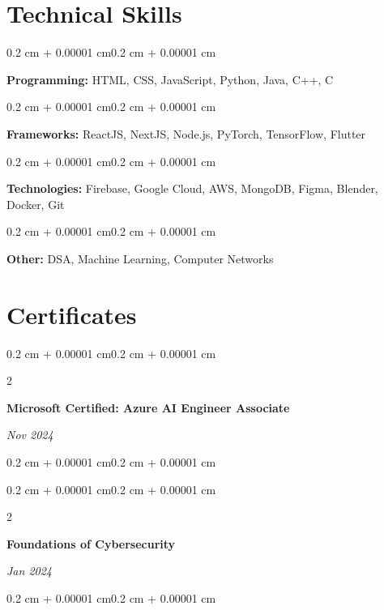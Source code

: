 \documentclass[10pt, letterpaper]{article}
\newenvironment{onecolentry}{
    \begin{adjustwidth}{0.2 cm + 0.00001 cm}{0.2 cm + 0.00001 cm}
}{
    \end{adjustwidth}
}
\newenvironment{twocolentry}[2][]{
    \onecolentry
    \def\secondColumn{#2}
    \setcolumnwidth{\fill, 4.5 cm}
    \begin{paracol}{2}
}{
    \switchcolumn \raggedleft \secondColumn
    \end{paracol}
    \endonecolentry
}
\let\hrefWithoutArrow\href
\renewcommand{\href}[2]{\hrefWithoutArrow{#1}{\ifthenelse{\equal{#2}{}}{ }{#2 }\raisebox{.15ex}{\footnotesize \faExternalLink*}}}
\begin{document}
    \section{Technical Skills}
        \begin{onecolentry}
            \textbf{Programming:} HTML, CSS, JavaScript, Python, Java, C++, C
        \end{onecolentry}
        \vspace{0.2 cm}
        \begin{onecolentry}
            \textbf{Frameworks:} ReactJS, NextJS, Node.js, PyTorch, TensorFlow, Flutter
        \end{onecolentry}
        \vspace{0.2 cm}
        \begin{onecolentry}
            \textbf{Technologies:} Firebase, Google Cloud, AWS, MongoDB, Figma, Blender, Docker, Git
        \end{onecolentry}
        \vspace{0.2 cm}
        \begin{onecolentry}
            \textbf{Other:} DSA, Machine Learning, Computer Networks
        \end{onecolentry}

    \section{Certificates}
        \begin{twocolentry}{
            \textit{Nov 2024}}
            \textbf{Microsoft Certified: Azure AI Engineer Associate}
        \end{twocolentry}
        \vspace{0.10 cm}
        \begin{onecolentry}
            \href{https://www.linkedin.com/posts/keerthivasansv_azure-ai-engineer-associate-certification-activity-7267554844545028096-2en2?utm_source=share&utm_medium=member_desktop&rcm=ACoAADbV348BQPB7ISYjn9s6OrfoDmYAtlkqc-o}{Link}
        \end{onecolentry}
        
        \vspace{0.2 cm}
        \begin{twocolentry}{
            \textit{Jan 2024}}
            \textbf{Foundations of Cybersecurity}
        \end{twocolentry}
        \vspace{0.10 cm}
        \begin{onecolentry}
            \href{https://www.coursera.org/account/accomplishments/verify/GZNTBVHZGCFP}{Link}
        \end{onecolentry}
\end{document}

